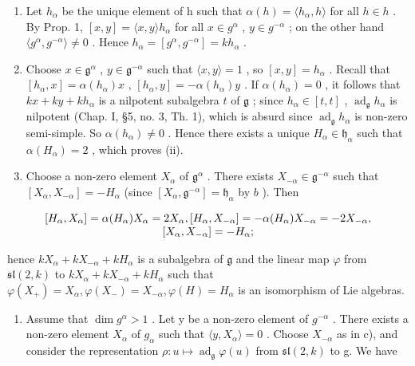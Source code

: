 \begin{enumerate}
\def\labelenumi{\alph{enumi})}
\item
  Let \(h_{\alpha}\) be the unique element of h such that \(\alpha(h) = \langle h_{\alpha}, h \rangle\) for all \(h \in h\) . By Prop. 1, \([x, y] = \langle x, y \rangle h_{\alpha}\) for all \(x \in g^{\alpha}\) , \(y \in g^{-\alpha}\) ; on the other hand \(\langle g^{\alpha}, g^{-\alpha} \rangle \neq 0\) . Hence \(h_{\alpha} = [g^{\alpha}, g^{-\alpha}] = kh_{\alpha}\) .
\item
  Choose \(x \in \mathfrak{g}^{\alpha}\) , \(y \in \mathfrak{g}^{-\alpha}\) such that \(\langle x, y \rangle = 1\) , so \([x, y] = h_{\alpha}\) . Recall that \([h_{\alpha}, x] = \alpha(h_{\alpha})x\) , \([h_{\alpha}, y] = -\alpha(h_{\alpha})y\) . If \(\alpha(h_{\alpha}) = 0\) , it follows that \(kx + ky + kh_{\alpha}\) is a nilpotent subalgebra \(t\) of \(\mathfrak{g}\) ; since \(h_{\alpha} \in [t, t]\) , \(\operatorname{ad}_{\mathfrak{g}} h_{\alpha}\) is nilpotent (Chap. I, §5, no. 3, Th. 1), which is absurd since \(\operatorname{ad}_{\mathfrak{g}} h_{\alpha}\) is non-zero semi-simple. So \(\alpha(h_{\alpha}) \neq 0\) . Hence there exists a unique \(H_{\alpha} \in \mathfrak{h}_{\alpha}\) such that \(\alpha(H_{\alpha}) = 2\) , which proves (ii).
\item
  Choose a non-zero element \(X_{\alpha}\) of \(\mathfrak{g}^{\alpha}\) . There exists \(X_{-\alpha} \in \mathfrak{g}^{-\alpha}\) such that \([X_{\alpha}, X_{-\alpha}] = -H_{\alpha}\) (since \([X_{\alpha}, \mathfrak{g}^{-\alpha}] = \mathfrak{h}_{\alpha}\) by \(b\) ). Then
\end{enumerate}

\[
\begin{array}{c} [ H _ {\alpha}, X _ {\alpha} ] = \alpha (H _ {\alpha}) X _ {\alpha} = 2 X _ {\alpha}, [ H _ {\alpha}, X _ {- \alpha} ] = - \alpha (H _ {\alpha}) X _ {- \alpha} = - 2 X _ {- \alpha}, \\ \relax [ X _ {\alpha}, X _ {- \alpha} ] = - H _ {\alpha}; \end{array}
\]

hence \(kX_{\alpha} + kX_{-\alpha} + kH_{\alpha}\) is a subalgebra of \(\mathfrak{g}\) and the linear map \(\varphi\) from \(\mathfrak{sl}(2,k)\) to \(kX_{\alpha} + kX_{-\alpha} + kH_{\alpha}\) such that \(\varphi(X_{+}) = X_{\alpha}, \varphi(X_{-}) = X_{-\alpha}, \varphi(H) = H_{\alpha}\) is an isomorphism of Lie algebras.

\begin{enumerate}
\def\labelenumi{\alph{enumi})}
\setcounter{enumi}{3}
\tightlist
\item
  Assume that \(\dim g^{\alpha} > 1\) . Let y be a non-zero element of \(g^{-\alpha}\) . There exists a non-zero element \(X_{\alpha}\) of \(g_{\alpha}\) such that \(\langle y, X_{\alpha} \rangle = 0\) . Choose \(X_{-\alpha}\) as in c), and consider the representation \(\rho : u \mapsto \operatorname{ad}_{\mathfrak{g}} \varphi(u)\) from \(\mathfrak{sl}(2, k)\) to g. We have
\end{enumerate}

